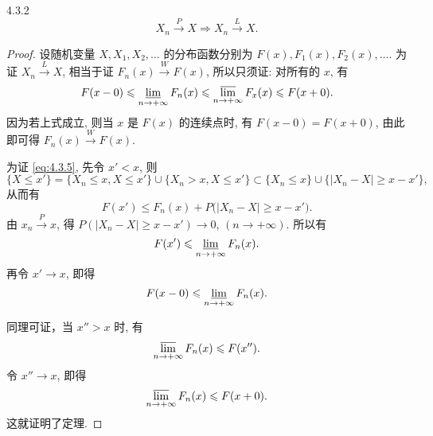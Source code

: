 \begin{theorem}{}{4.3.2}
    \begin{equation*}
        X_n \stackrel{P}{\to} X \Rightarrow X_n \stackrel{L}{\to} X.
    \end{equation*}
\end{theorem}

\begin{proof}
    设随机变量 $ X, X_1,  X_2, \dotsc $  的分布函数分别为 $ F (x), F_1 (x), F_2 (x), \dotsc $.
    为证 $ X_n \stackrel{L}{\to} X $, 相当于证 $ F_n (x) \stackrel{W}{\to} F (x) $, 所以只须证: 对所有的 $ x $, 有
    \begin{equation}\label{eq:4.3.5}
        F ( x - 0 ) \leq \varliminf_{n \to +\infty} F_n (x) \leq \varlimsup_{n \to +\infty} F_x (x) \leq F ( x + 0 ).
    \end{equation}
    因为若上式成立, 则当 $ x $ 是 $ F (x) $ 的连续点时, 有 $ F (x-0) =F (x+0) $, 由此即可得 $ F_n (x) \stackrel{W}{\to} F (x) $.

    为证 \eqref{eq:4.3.5}, 先令 $ x' < x $, 则
    \begin{equation*}
        \{ X \leq x' \} = \{ X_n \leq x, X \leq x' \} \cup \{ X_n > x, X \leq x' \} \subset \{ X_n \leq x \} \cup \{ \bigl\lvert X_n - X \bigr\rvert \geq x - x' \},
    \end{equation*}
    从而有
    \begin{equation*}
        F (x') \leq F_n (x) + P \bigl( \bigl\lvert X_n - X \bigr\rvert \geq x - x' \bigr).
    \end{equation*}
    由 $ x_n \stackrel{P}{\to} x $, 得 $ P ( \lvert X_n - X \rvert \geq x - x' ) \to 0 $, $ (n \to +\infty) $.
    所以有
    \begin{equation*}
        F (x') \leq \varliminf_{n \to +\infty} F_n (x).
    \end{equation*}
    再令 $ x' \to x $, 即得
    \begin{equation*}
        F (x-0) \leq \varliminf_{n \to +\infty} F_n (x).
    \end{equation*}

    同理可证，当 $ x'' > x $ 时, 有
    \begin{equation*}
        \varlimsup_{n \to +\infty} F_n (x) \leq F (x'').
    \end{equation*}
    令 $ x'' \to x $, 即得
    \begin{equation*}
        \varlimsup_{n \to +\infty} F_n (x) \leq F (x + 0).
    \end{equation*}
    这就证明了定理.
\end{proof}

